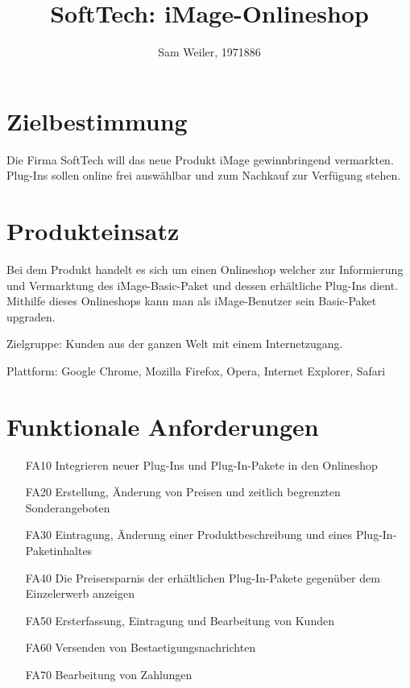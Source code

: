 \documentclass[parskip=full]{scrartcl}
\title{SoftTech: \gls{iMage}-Onlineshop}
\author{Sam Weiler, 1971886}
\begin{document}
\maketitle
\tableofcontents

\section{Zielbestimmung}
Die Firma SoftTech will das neue Produkt \gls{iMage} gewinnbringend vermarkten. \gls{Plug-In}s sollen online frei auswählbar und zum Nachkauf zur Verfügung stehen.

\section{Produkteinsatz}
Bei dem Produkt handelt es sich um einen \gls{Onlineshop} welcher zur Informierung und Vermarktung des \gls{iMage}-Basic-Paket und dessen erhältliche \gls{Plug-In}s dient. Mithilfe dieses \gls{Onlineshop}s kann man als \gls{iMage}-Benutzer sein Basic-Paket \gls{upgraden}.

Zielgruppe: \gls{Kunde}n aus der ganzen Welt mit einem Internetzugang.

Plattform: \gls{Google Chrome}, \gls{Mozilla Firefox}, \gls{Opera}, \gls{Internet Explorer}, \gls{Safari}

\section{Funktionale Anforderungen}
\begin{itemize}[nosep]
\item[FA10] Integrieren neuer \gls{Plug-In}s und \gls{Plug-In}-Pakete in den \gls{Onlineshop}
\item[FA20] Erstellung, Änderung von Preisen und zeitlich begrenzten \gls{Sonderangebot}en
\item[FA30] Eintragung, Änderung einer Produktbeschreibung und eines \gls{Plug-In}-Paketinhaltes
\item[FA40] Die Preisersparnis der erhältlichen \gls{Plug-In}-Pakete gegenüber dem Einzelerwerb anzeigen
\item[FA50] Ersterfassung, Eintragung und Bearbeitung von \gls{Kunde}n
\item[FA60] Versenden von \gls{Bestaetigungsnachricht}en
\item[FA70] Bearbeitung von Zahlungen
\end{itemize}
\end{document}
